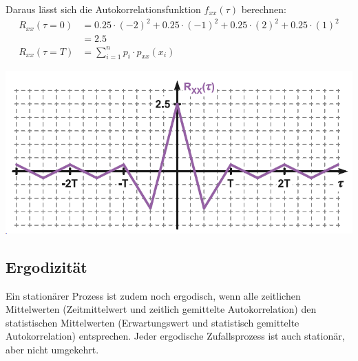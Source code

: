Daraus lässt sich die Autokorrelationsfunktion $f_{xx}(\tau)$ berechnen:
\begin{align*}
	R_{xx}(\tau = 0) &= 0.25\cdot(-2)^2 + 0.25\cdot (-1)^2+  0.25\cdot(2)^2 + 0.25\cdot (1)^2 \\ &= 2.5 \\
	R_{xx}(\tau = T) &= \sum_{i = 1}^{n}p_i \cdot p_{xx}(x_i) 
\end{align*}

\begin{center}
	\includegraphics[width=\columnwidth]{Images/statische_ak3}
\end{center}

\subsection{Ergodizität}
Ein stationärer Prozess ist zudem noch ergodisch, wenn alle zeitlichen Mittelwerten (Zeitmittelwert und zeitlich gemittelte Autokorrelation) den statistischen Mittelwerten (Erwartungswert und statistisch gemittelte Autokorrelation) entsprechen. Jeder ergodische Zufallsprozess ist auch stationär, aber nicht umgekehrt.
